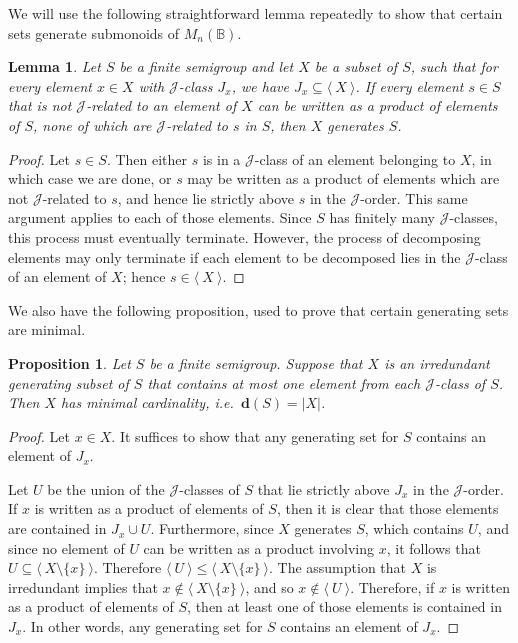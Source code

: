 \documentclass[11pt]{article}
\newtheorem{prop}[thm]{Proposition}
\newtheorem{lemma}[thm]{Lemma}
\numberwithin{equation}{section}
\newcommand{\genset}[1]{\ensuremath{\langle\: #1 \:\rangle}}
\newcommand{\B}{\mathbb{B}}
\newcommand{\Bn}{M_n(\B)}
\newcommand{\J}{\mathscr{J}}
\begin{document}
We will use the following straightforward lemma repeatedly to show that certain
sets generate submonoids of $\Bn$.
\begin{lemma}
  Let $S$ be a finite semigroup and let $X$ be a subset of $S$, such that for
  every element $x \in X$ with $\J$-class $J_x$, we have $J_x \subseteq
  \genset{X}$. If every element $s \in S$ that is not $\J$-related to an element
  of $X$ can be written as a product of elements of $S$, none of which are
  $\J$-related to $s$ in $S$, then $X$ generates $S$. 
\end{lemma}
\begin{proof}
  Let $s \in S$. Then either $s$ is in a $\J$-class of an element belonging to
  $X$, in which case we are done, or $s$ may be written as a product of elements
  which are not $\J$-related to $s$, and hence lie strictly above $s$ in the
  $\J$-order. This same argument applies to each of those elements. Since $S$
  has finitely many $\J$-classes, this process must eventually terminate.
  However, the process of decomposing elements may only terminate if each
  element to be decomposed lies in the $\J$-class of an element of $X$; hence $s
  \in \genset{X}$.
\end{proof}

We also have the following proposition, used to prove that certain generating sets are
minimal. 
\begin{prop}
  Let $S$ be a finite semigroup. Suppose that $X$ is an irredundant generating
  subset of $S$ that contains at most one element from each $\J$-class of $S$.
  Then $X$ has minimal cardinality, i.e.\ $\mathbf{d}(S) = |X|$.
\end{prop}
\begin{proof}
  Let $x \in X$.
  It suffices to show that any generating set for $S$ contains an
  element of $J_{x}$.

  Let $U$ be the union of the $\J$-classes of $S$ that lie strictly above
  $J_{x}$ in the $\J$-order.  If $x$ is written as a product of elements of $S$,
  then it is clear that those elements are contained in $J_{x} \cup U$.
  Furthermore, since $X$ generates $S$, which contains $U$, and since no element
  of $U$ can be written as a product involving $x$, it follows that $U \subseteq
  \genset{X \setminus \{x\}}$.  Therefore $\genset{U} \leq \genset{X \setminus
  \{x\}}$. The assumption that $X$ is irredundant implies that $x \not\in
  \genset{X \setminus \{x\}}$, and so $x \not\in \genset{U}$.  Therefore, if $x$
  is written as a product of elements of $S$, then at least one of those
  elements is contained in $J_{x}$.  In other words, any generating set for $S$
  contains an element of $J_{x}$.
\end{proof}
\end{document}

